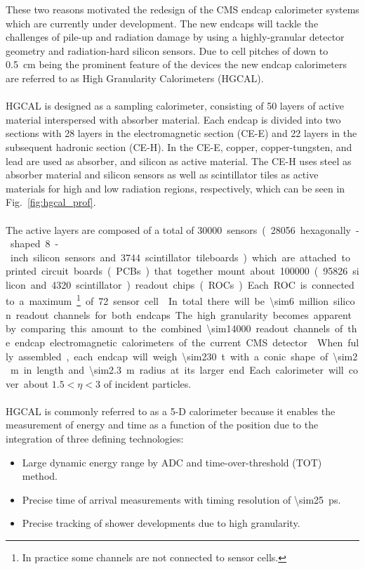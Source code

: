 \documentclass[../../main.tex]{subfiles}
\begin{document}
These two reasons motivated the redesign of the CMS endcap calorimeter systems which are currently under development. The new endcaps will tackle the challenges of pile-up and radiation damage by using a highly-granular detector geometry and radiation-hard silicon sensors. Due to cell pitches of down to \SI{0.5}{cm} being the prominent feature of the devices the new endcap calorimeters are referred to as High Granularity Calorimeters (HGCAL).\\
\\
HGCAL is designed as a sampling calorimeter, consisting of 50 layers of active material interspersed with absorber material. Each endcap is divided into two sections with 28 layers in the electromagnetic section (CE-E) and 22 layers in the subsequent hadronic section (CE-H). In the CE-E, copper, copper-tungsten, and lead are used as absorber, and silicon as active material. The CE-H uses steel as absorber material and silicon sensors as well as scintillator tiles as active materials for high and low radiation regions, respectively, which can be seen in Fig.~\ref{fig:hgcal_prof}.\\
\\
The active layers are composed of a total of \SI{30000} sensors (\SI{28056} hexagonally-shaped 8-inch silicon sensors and \SI{3744} scintillator tileboards) which are attached to printed circuit boards (PCBs) that together mount about \SI{100000} (\SI{95826} silicon and \SI{4320} scintillator) readout chips (ROCs). Each ROC is connected to a maximum\footnote{In practice some channels are not connected to sensor cells.} of 72 sensor cell \cite{si_rep, sipm_rep}. In total there will be \SI{\sim6} million silicon readout channels for both endcaps. The high granularity becomes apparent by comparing this amount to the combined \SI{\sim14000} readout channels of the endcap electromagnetic calorimeters of the current CMS detector \cite{calo_rev}. When fully assembled, each endcap will weigh \SI{\sim230}{t} with a conic shape of \SI{\sim2}{m} in length and \SI{\sim2.3}{m} radius at its larger end. Each calorimeter will cover about $1.5<\eta<3$ of incident particles.\\
\\
HGCAL is commonly referred to as a 5-D calorimeter because it enables the measurement of energy and time as a function of the position due to the integration of three defining technologies:
\begin{itemize}
	\item Large dynamic energy range by ADC and time-over-threshold (TOT) method.
	\item Precise time of arrival measurements with timing resolution of \SI{\sim25}{ps}.
	\item Precise tracking of shower developments due to high granularity.
\end{itemize}
\end{document}
